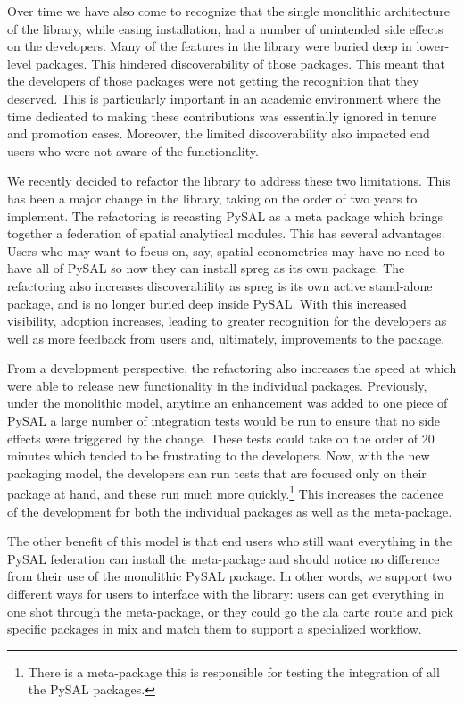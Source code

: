 \documentclass[11pt]{article}
\begin{document}
Over time we have also come to recognize that the single monolithic
architecture of the library, while easing installation, had a number of
unintended side effects on the developers. Many of the features in the library
were buried deep in lower-level packages. This hindered discoverability of
those packages. This meant that the developers of those packages were not
getting the recognition that they deserved. This is particularly important in an
academic environment where the time dedicated to making these contributions was
essentially ignored in tenure and promotion cases. Moreover, the limited
discoverability also impacted end users who were not aware of the
functionality.


We recently decided to refactor the library to address these two limitations.
This has been a major change in the library, taking on the order of two years
to implement. The refactoring is recasting PySAL as a meta package which brings
together a federation of spatial analytical modules. This has several
advantages. Users who may want to focus on, say, spatial econometrics
may have no need to have all of PySAL so now they can install spreg as its own
package. The refactoring also increases discoverability as spreg is its own
active stand-alone package, and is no longer buried deep inside PySAL. With
this increased visibility, adoption increases, leading to greater recognition
for the developers as well as more feedback from users and, ultimately,
improvements to the package.

From a development perspective, the refactoring also increases the speed at
which were able to release new functionality in the individual packages.
Previously, under the monolithic model, anytime an enhancement was
added to one piece of PySAL a large number of integration tests would be run to
ensure that no side effects were triggered by the change. These tests could
take on the order of 20 minutes which tended to be frustrating
to the developers. Now, with the new packaging model, the developers can run
 tests that are focused only on their package at hand, and these run much more
quickly.\footnote{There is a meta-package this is responsible for testing the
integration of all the PySAL packages.} This increases the cadence of the development for both
the individual packages as well as the meta-package.


The other benefit of this model is that end users who still want everything in
the PySAL federation can install the meta-package and should notice no
difference from their use of the monolithic PySAL package. In other words, we
support two different ways for users to interface with the library: users can
get everything in one shot through the meta-package, or they could go the ala
carte route and pick specific packages in mix and match them to support a
specialized workflow.
\end{document}
